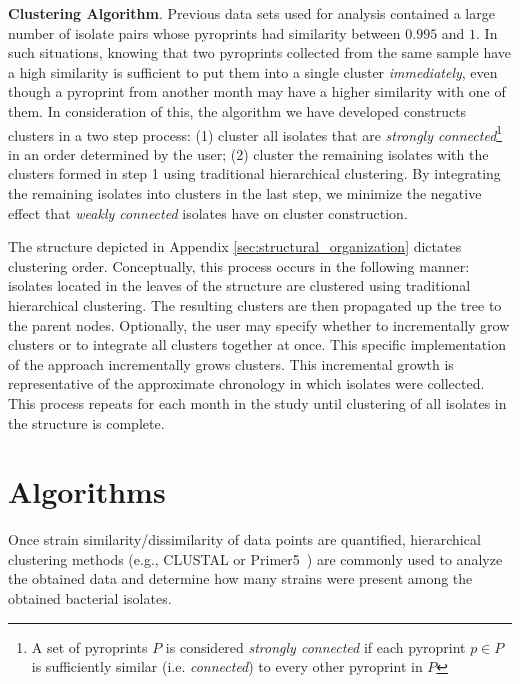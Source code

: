\documentclass[12pt]{ucthesis}
\begin{document}
      \textbf{Clustering Algorithm}. Previous data sets used for analysis contained a
      large number of isolate pairs whose pyroprints had similarity between $0.995$
      and $1$. In such situations, knowing that two pyroprints collected from the
      same sample have a high similarity is sufficient to put them into a single
      cluster \textit{immediately}, even though a pyroprint from another month may
      have a higher similarity with one of them. In consideration of this, the
      algorithm we have developed constructs clusters in a two step process: (1)
      cluster all isolates that are \textit{strongly connected}\footnote{A set of
      pyroprints $P$ is considered \textit{strongly connected} if each pyroprint $p
      \in P$ is sufficiently similar (i.e. \textit{connected}) to every other
      pyroprint in $P$} in an order determined by the user; (2) cluster the remaining
      isolates with the clusters formed in step 1 using traditional hierarchical
      clustering. By integrating the remaining isolates into clusters in the last
      step, we minimize the negative effect that \textit{weakly connected} isolates
      have on cluster construction.

      The structure depicted in Appendix \ref{sec:structural_organization} dictates
      clustering order. Conceptually, this process occurs in the following manner:
      isolates located in the leaves of the structure are clustered using traditional
      hierarchical clustering. The resulting clusters are then propagated up the tree
      to the parent nodes. Optionally, the user may specify whether to incrementally
      grow clusters or to integrate all clusters together at once. This specific
      implementation of the approach incrementally grows clusters. This
      incremental growth is representative of the approximate chronology in which
      isolates were collected. This process repeats%
      for each month in the study until clustering of all isolates in the structure
      is complete.

\chapter{Algorithms}\label{chap:algorithm}
      Once strain similarity/dissimilarity of data points are quantified,
      hierarchical clustering methods (e.g., CLUSTAL or Primer5~\cite{Primer5:methods})
      are commonly used to analyze the obtained data and determine
      how many strains were present among the obtained bacterial isolates.
      
\end{document}
